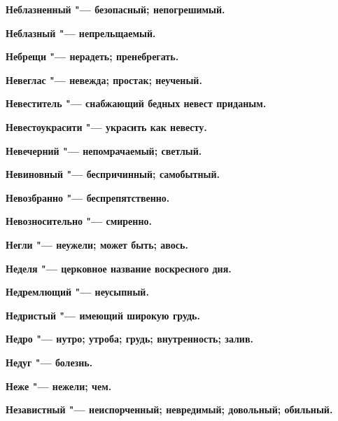 \begin{mymulticols}{2}
\bfseries Неблазненный\normalfont{} "--- безопасный; непогрешимый. 




\bfseries Неблазный\normalfont{} "--- непрельщаемый. 




\bfseries Небрещи\normalfont{} "--- нерадеть; пренебрегать. 




\bfseries Невеглас\normalfont{} "--- невежда; простак; неученый. 




\bfseries Невеститель\normalfont{} "--- снабжающий бедных невест приданым. 




\bfseries Невестоукрасити\normalfont{} "--- украсить как невесту. 




\bfseries Невечерний\normalfont{} "--- непомрачаемый; светлый. 




\bfseries Невиновный\normalfont{} "--- беспричинный; самобытный. 




\bfseries Невозбранно\normalfont{} "--- беспрепятственно. 




\bfseries Невозносительно\normalfont{} "--- смиренно. 




\bfseries Негли\normalfont{} "--- неужели; может быть; авось. 




\bfseries Неделя\normalfont{} "--- церковное название воскресного дня. 




\bfseries Недремлющий\normalfont{} "--- неусыпный. 




\bfseries Недристый\normalfont{} "--- имеющий широкую грудь. 




\bfseries Недро\normalfont{} "--- нутро; утроба; грудь; внутренность; залив. 




\bfseries Недуг\normalfont{} "--- болезнь. 




\bfseries Неже\normalfont{} "--- нежели; чем. 




\bfseries Независтный\normalfont{} "--- неиспорченный; невредимый; довольный; обильный. 





\end{mymulticols}
